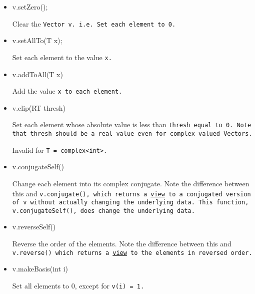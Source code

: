 \begin{itemize}

\item
\begin{tmvcode}
v.setZero();
\end{tmvcode}
Clear the \tt{Vector v}.  i.e. Set each element to 0.

\item
\begin{tmvcode}
v.setAllTo(T x);
\end{tmvcode}
Set each element to the value \tt{x}.

\item
\begin{tmvcode}
v.addToAll(T x)
\end{tmvcode}
Add the value \tt{x} to each element.

\item
\begin{tmvcode}
v.clip(RT thresh)
\end{tmvcode}
Set each element whose absolute value is less than \tt{thresh} equal to 0.
Note that \tt{thresh} should be a real value even for complex valued
\tt{Vector}s.  

Invalid for \tt{T = complex<int>}.

\item 
\begin{tmvcode}
v.conjugateSelf()
\end{tmvcode}
Change each element into its complex conjugate.  
Note the difference between this and \tt{v.conjugate()}, 
which returns a \underline{view} to a conjugated version of \tt{v} without
actually changing the underlying data.  This function, \tt{v.conjugateSelf()},
does change the underlying data.

\item
\begin{tmvcode}
v.reverseSelf()
\end{tmvcode}
Reverse the order of the elements.  Note the difference between this and 
\tt{v.reverse()} which returns a \underline{view} to the elements in 
reversed order.

\item
\begin{tmvcode}
v.makeBasis(int i)
\end{tmvcode}
Set all elements to 0, except for \tt{v(i)} = 1.


\end{itemize}
